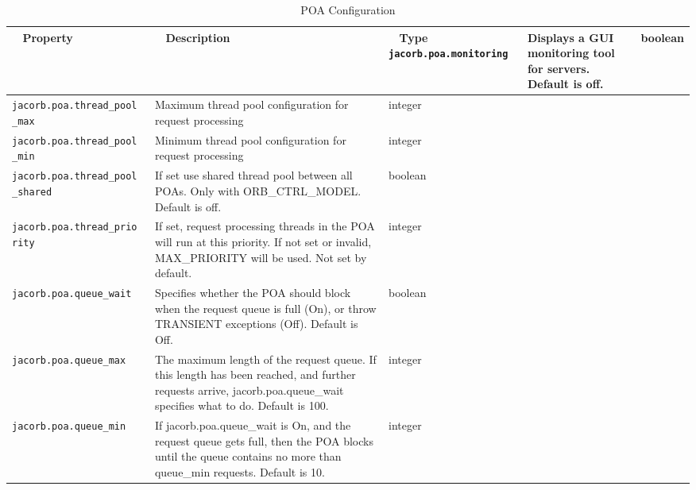 {{\begin{small}
\begin{longtable}{|p{5cm}|p{9cm}|p{2cm}|}
\hline
\end{longtable}
\end{small}


\begin{small}
\begin{longtable}{|p{5cm}|p{9cm}|p{2cm}|}
\caption{POA Configuration}\\
\hline
~ \hfill \textbf {Property} \hfill ~ & ~ \hfill \textbf {Description} \hfill ~ & ~ \hfill \textbf {Type} \hfill ~ \endhead
\hline
\verb"jacorb.poa.monitoring" & Displays a GUI monitoring tool for servers. Default is off. & boolean \\
\hline
\verb"jacorb.poa.thread_pool"
\verb"_max" & Maximum thread pool configuration for request processing & integer \\
\hline
\verb"jacorb.poa.thread_pool"
\verb"_min" & Minimum thread pool configuration for request processing & integer \\
\hline
\verb"jacorb.poa.thread_pool"
\verb"_shared" & If set use shared thread pool between all POAs. Only with
ORB\_CTRL\_MODEL. Default is off. & boolean \\
\hline
\verb"jacorb.poa.thread_prio"
\verb"rity" & If set, request processing threads in the POA will run at this priority. If not set or invalid, MAX\_PRIORITY will be used. Not set by default. & integer \\
\hline
\verb"jacorb.poa.queue_wait" & Specifies whether the POA should block
when the request queue is full (On), or throw TRANSIENT exceptions
(Off). Default is Off. & boolean\\
\hline
\verb"jacorb.poa.queue_max" & The maximum length of the request
queue.  If this length has been reached, and further requests arrive,
jacorb.poa.queue\_wait specifies what to do. Default is 100. & integer \\
\hline
\verb"jacorb.poa.queue_min" & If jacorb.poa.queue\_wait is On, and the
request queue gets full, then the POA blocks until the queue contains
no more than queue\_min requests. Default is 10. & integer \\
\hline

\end{longtable}
\end{small}


}}
